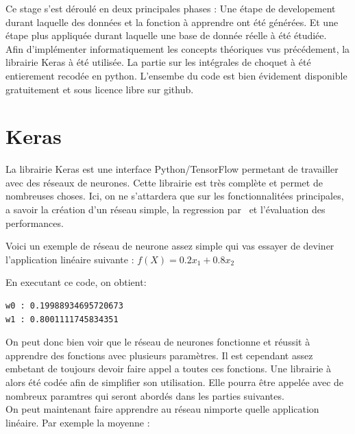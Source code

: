 Ce stage s'est déroulé en deux principales phases :
Une étape de developement durant laquelle des données et la fonction à apprendre ont été générées.
Et une étape plus appliquée durant laquelle une base de donnée réelle à été étudiée.\\


Afin d'implémenter informatiquement les concepts théoriques vus précédement, la librairie Keras à été utilisée\cite{keras}.
La partie sur les intégrales de choquet à été entierement recodée en python.
L'ensembe du code est bien évidement disponible gratuitement et sous licence libre sur github\cite{repoStage}.

\section{Keras}\label{sec:keras}
La librairie Keras est une interface Python/TensorFlow permetant de travailler avec des réseaux de neurones.
Cette librairie est très complète et permet de nombreuses choses.
Ici, on ne s'attardera que sur les fonctionnalitées principales,
a savoir la création d'un réseau simple,
la regression par \sgd\ et l'évaluation des performances.


Voici un exemple de réseau de neurone assez simple
qui vas essayer de deviner l'application linéaire suivante : $f(X) = 0.2x_1 + 0.8x_2$

En executant ce code, on obtient:
\begin{lstlisting}
w0 : 0.19988934695720673
w1 : 0.8001111745834351
\end{lstlisting}
On peut donc bien voir que le réseau de neurones fonctionne et
réussit à apprendre des fonctions avec plusieurs paramètres.
Il est cependant assez embetant de toujours devoir faire appel a toutes ces fonctions.
Une librairie à alors été codée afin de simplifier son utilisation.
Elle pourra être appelée avec de nombreux paramtres qui seront abordés dans les parties suivantes.\\


On peut maintenant faire apprendre au réseau nimporte quelle application linéaire.
Par exemple la moyenne :

